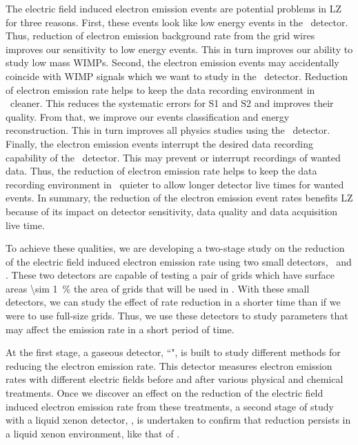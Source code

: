 The electric field induced electron emission events are potential problems in LZ for three reasons. First, these events look like low energy events in the \lze\ detector. Thus, reduction of electron emission background rate from the grid wires improves our sensitivity to low energy events. This in turn improves our ability to study low mass WIMPs. 
Second, the electron emission events may accidentally coincide with WIMP signals which we want to study in the \lze\ detector. Reduction of electron emission rate helps to keep the data recording environment in \lze\ cleaner. This reduces the systematic errors for S1 and S2 and improves their quality. From that, we improve our events classification and energy reconstruction. This in turn improves all physics studies using the \lze\ detector. 
Finally, the electron emission events interrupt the desired data recording capability of the \lze\ detector. This may prevent or interrupt recordings of wanted data. Thus, the reduction of electron emission rate helps to keep the data recording environment in \lze\ quieter to allow longer detector live times for wanted events.
In summary, the reduction of the electron emission event rates benefits LZ because of its impact on detector sensitivity, data quality and data acquisition live time. 

To achieve these qualities, we are developing a two-stage study on the reduction of the electric field induced electron emission rate using two small detectors, \gtest\ and \phaseone . These two detectors are capable of testing a pair of grids which have surface areas  \SI{\sim 1}{\percent} the area of grids that will be used in \lze . With these small detectors, we can study the effect of rate reduction in a shorter time than if we were to use full-size grids. Thus, we use these detectors to study parameters that may affect the emission rate in a short period of time.

At the first stage, a gaseous detector, ``\gtest ", is built to study different methods for reducing the electron emission rate. This detector measures electron emission rates with different electric fields before and after various physical and chemical treatments. Once we discover an effect on the reduction of the electric field induced electron emission rate from these treatments, a second stage of study with a liquid xenon detector, \phaseone , is undertaken to confirm that reduction persists in a liquid xenon environment, like that of \lze. 

